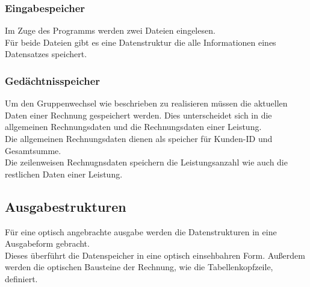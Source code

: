 \subsubsection{Eingabespeicher}\label{subsubsubsec:eingabespeicher}
Im Zuge des Programms werden zwei Dateien eingelesen.\\
Für beide Dateien gibt es eine Datenstruktur die alle Informationen eines Datensatzes speichert.\\

\subsubsection{Gedächtnisspeicher}\label{subsubsubsubsec:gedaechtnisspeicher}
Um den Gruppenwechsel wie beschrieben zu realisieren müssen die aktuellen Daten einer Rechnung gespeichert werden. Dies unterscheidet sich in die allgemeinen Rechnungsdaten und die Rechnungsdaten einer Leistung.\\
Die allgemeinen Rechnungsdaten dienen als speicher für Kunden-ID und Gesamtsumme.\\
Die zeilenweisen Rechnugnsdaten speichern die Leistungsanzahl wie auch die restlichen Daten einer Leistung.\\

\subsection{Ausgabestrukturen}\label{subsubsec:ausgabestrukturen}
Für eine optisch angebrachte ausgabe werden die Datenstrukturen in eine Ausgabeform gebracht.\\
Dieses überführt die Datenspeicher in eine optisch einsehbahren Form. Außerdem werden die optischen Bausteine der Rechnung, wie die Tabellenkopfzeile, definiert.\\